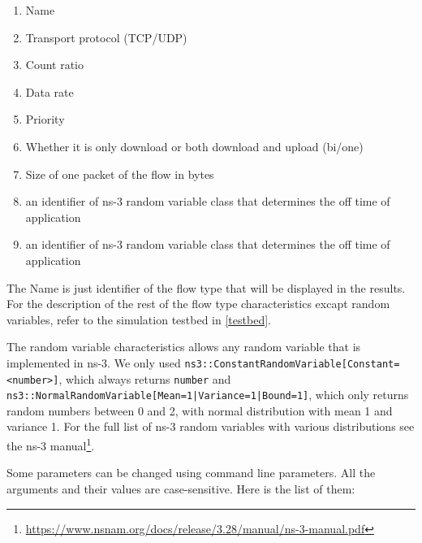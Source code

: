 \begin{enumerate}
	\item Name
	\item Transport protocol (TCP/UDP)
	\item Count ratio
	\item Data rate
	\item Priority
	\item Whether it is only download or both download and upload (bi/one)
	\item Size of one packet of the flow in bytes
	\item an identifier of ns-3 random variable class that determines the off time of application
	\item an identifier of ns-3 random variable class that determines the off time of application
\end{enumerate}

The Name is just identifier of the flow type that will be displayed in the results. For the description of the rest of the flow type characteristics excapt random variables, refer to the simulation testbed in \autoref{testbed}.

\sloppypar
The random variable characteristics allows any random variable that is implemented in ns-3. We only used  \texttt{\small ns3::ConstantRandomVariable[Constant=<number>]}, which always returns  \texttt{\small number} and \texttt{ ns3::NormalRandomVariable[Mean=1|Variance=1|Bound=1]}, which only returns random numbers between 0 and 2, with normal distribution with mean 1 and variance 1. For the full list of ns-3 random variables with various distributions see the ns-3 manual\footnote{\url{https://www.nsnam.org/docs/release/3.28/manual/ns-3-manual.pdf}}.

Some parameters can be changed using command line parameters. All the arguments and their values are case-sensitive. Here is the list of them: 

